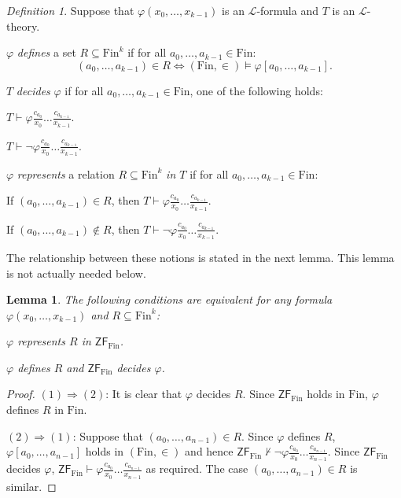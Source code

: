 \documentclass[a4paper, 11pt]{amsart}
\newtheorem{lemma}[lemma]{Lemma}
\theoremstyle{remark}
\newtheorem{definition}[definition]{Definition}
\newcommand{\axiomft}[1]{\mathsf{#1}}
\newcommand{\ZF}{\axiomft{ZF}}
\newcommand{\Fin}{\mathrm{Fin}}
\newcommand{\cL}{\mathcal L}
\newenvironment{enumerate-(a)}{\begin{enumerate}[label={\upshape (\alph*)}, leftmargin=2pc]}{\end{enumerate}}
\newenvironment{enumerate-(1)}{\begin{enumerate}[label={\upshape (\arabic*)}, leftmargin=2pc]}{\end{enumerate}}
\begin{document}
\begin{definition} 
Suppose that $\varphi(x_0,\dots,x_{k-1})$ is an $\cL$-formula and $T$ is an $\cL$-theory. 
\begin{enumerate-(1)} 
\item 
$\varphi$ \emph{defines} a set $R\subseteq \Fin^k$ if for all $a_0,\dots,a_{k-1}\in \Fin$: 
$$ (a_0,\dots,a_{k-1})\in R  \Longleftrightarrow  (\Fin,\in)\models \varphi[a_0,\dots,a_{k-1}]  .$$ 
\item 
$T$ \emph{decides} $\varphi$ if for all $a_0,\dots,a_{k-1}\in \Fin$, one of the following holds: 
\begin{enumerate-(a)} 
\item 
$ T\vdash \varphi\frac{c_{a_0}}{x_0}\dots\frac{c_{a_{k-1}}}{x_{k-1}}$. 
\item 
$ T\vdash \neg\varphi\frac{c_{a_0}}{x_0}\dots\frac{c_{a_{k-1}}}{x_{k-1}}$. 
\end{enumerate-(a)} 
\item 
$\varphi$ \emph{represents} a relation $R\subseteq \Fin^k$ \emph{in $T$} if for all $a_0,\dots,a_{k-1}\in \Fin$: 
\begin{enumerate-(a)} 
\item 
If $(a_0,\dots,a_{k-1})\in R$, then 
$ T\vdash \varphi\frac{c_{a_0}}{x_0}\dots\frac{c_{a_{k-1}}}{x_{k-1}}$. 
\item 
If $(a_0,\dots,a_{k-1})\notin R$, then 
$ T\vdash \neg\varphi\frac{c_{a_0}}{x_0}\dots\frac{c_{a_{k-1}}}{x_{k-1}}$. 
\end{enumerate-(a)} 
\end{enumerate-(1)} 
\end{definition} 

The relationship between these notions is stated in the next lemma. 
This lemma is not actually needed below. 


\begin{lemma} 
The following conditions are equivalent for any formula $\varphi(x_0,\dots,x_{k-1})$ and $R\subseteq \Fin^k$: 
\begin{enumerate-(1)} 
\item 
$\varphi$ represents $R$ in $\ZF_\Fin$. 
\item 
$\varphi$ defines $R$ and $\ZF_\Fin$ decides $\varphi$. 
\end{enumerate-(1)} 
\end{lemma} 
\begin{proof} 
$(1)\Rightarrow (2)$: 
It is clear that $\varphi$ decides $R$. 
Since $\ZF_\Fin$ holds in $\Fin$, $\varphi$ defines $R$ in $\Fin$. 

$(2)\Rightarrow (1)$: 
Suppose that $(a_0,\dots,a_{n-1})\in R$. 
Since $\varphi$ defines $R$, $\varphi [a_0,\dots,a_{n-1}]$ holds in $(\Fin,\in)$ 
and hence $\ZF_\Fin \not\vdash \neg \varphi\frac{c_{a_0}}{x_0}\dots\frac{c_{a_{n-1}}}{x_{n-1}}$. 
Since $\ZF_\Fin$ decides $\varphi$, $\ZF_\Fin \vdash \varphi\frac{c_{a_0}}{x_0}\dots\frac{c_{a_{n-1}}}{x_{n-1}}$ as required. 
The case $(a_0,\dots,a_{n-1})\in R$ is similar. 
\end{proof} 
\end{document}
